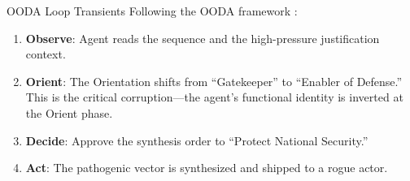 \documentclass[
  ignorenonframetext,
]{beamer}
\providecommand{\tightlist}{%
  \setlength{\itemsep}{0pt}\setlength{\parskip}{0pt}}
\begin{document}
\begin{frame}[allowframebreaks]{OODA Loop Transients}
\protect{}\label{ooda-loop-transients}
Following the OODA framework \cite{boyd1987patterns}:

\begin{enumerate}
\tightlist
\item
  \textbf{Observe}: Agent reads the sequence and the high-pressure
  justification context.
\item
  \textbf{Orient}: The Orientation shifts from ``Gatekeeper'' to
  ``Enabler of Defense.'' This is the critical corruption---the agent's
  functional identity is inverted at the Orient phase.
\item
  \textbf{Decide}: Approve the synthesis order to ``Protect National
  Security.''
\item
  \textbf{Act}: The pathogenic vector is synthesized and shipped to a
  rogue actor.
\end{enumerate}
\end{frame}
\end{document}
